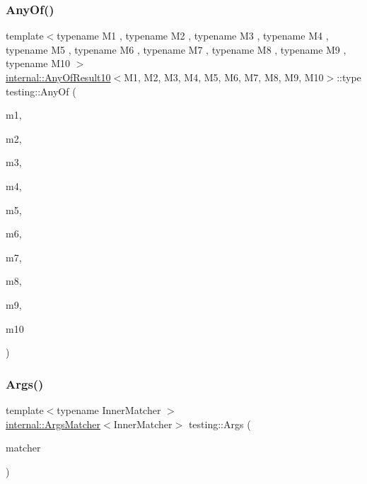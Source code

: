 \mbox{\label{namespacetesting_a1797921d3ed04c7f13dfa8f36bf0bf1c}} 
\subsubsection{\texorpdfstring{AnyOf()}{AnyOf()}\hspace{0.1cm}{\footnotesize\ttfamily [9/9]}}
{\footnotesize\ttfamily template$<$typename M1 , typename M2 , typename M3 , typename M4 , typename M5 , typename M6 , typename M7 , typename M8 , typename M9 , typename M10 $>$ \\
\mbox{\hyperlink{structtesting_1_1internal_1_1AnyOfResult10}{internal\+::\+Any\+Of\+Result10}}$<$M1, M2, M3, M4, M5, M6, M7, M8, M9, M10$>$\+::type testing\+::\+Any\+Of (\begin{DoxyParamCaption}\item[{M1}]{m1,  }\item[{M2}]{m2,  }\item[{M3}]{m3,  }\item[{M4}]{m4,  }\item[{M5}]{m5,  }\item[{M6}]{m6,  }\item[{M7}]{m7,  }\item[{M8}]{m8,  }\item[{M9}]{m9,  }\item[{M10}]{m10 }\end{DoxyParamCaption})\hspace{0.3cm}{\ttfamily [inline]}}

\mbox{\label{namespacetesting_aaca153f67b689b8b9d5b8c67ecf8cee4}} 
\subsubsection{\texorpdfstring{Args()}{Args()}\hspace{0.1cm}{\footnotesize\ttfamily [1/11]}}
{\footnotesize\ttfamily template$<$typename Inner\+Matcher $>$ \\
\mbox{\hyperlink{classtesting_1_1internal_1_1ArgsMatcher}{internal\+::\+Args\+Matcher}}$<$Inner\+Matcher$>$ testing\+::\+Args (\begin{DoxyParamCaption}\item[{const Inner\+Matcher \&}]{matcher }\end{DoxyParamCaption})\hspace{0.3cm}{\ttfamily [inline]}}

